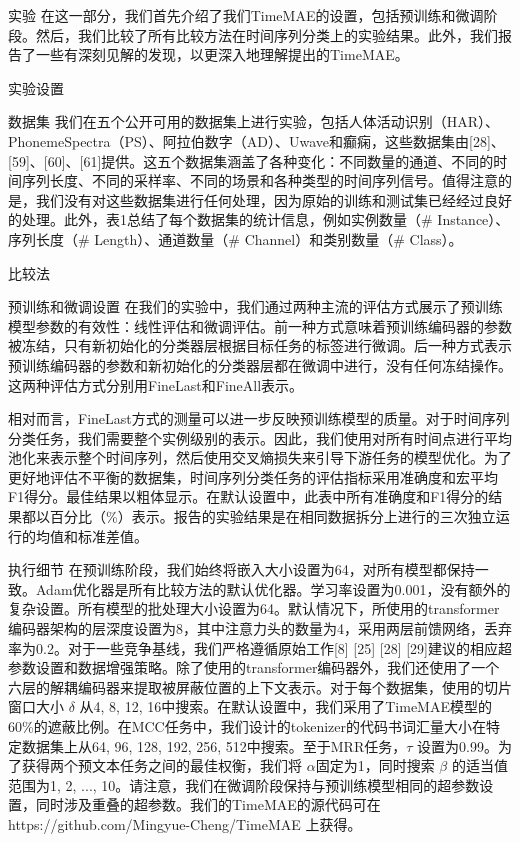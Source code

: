 \documentclass[a4paper,12pt]{article}
\begin{document}
\begin{section}{实验}
在这一部分，我们首先介绍了我们TimeMAE的设置，包括预训练和微调阶段。然后，我们比较了所有比较方法在时间序列分类上的实验结果。此外，我们报告了一些有深刻见解的发现，以更深入地理解提出的TimeMAE。
\begin{subsection}{实验设置}

\begin{subsubsection}{数据集}
我们在五个公开可用的数据集上进行实验，包括人体活动识别（HAR）、PhonemeSpectra（PS）、阿拉伯数字（AD）、Uwave和癫痫，这些数据集由[28]、[59]、[60]、[61]提供。这五个数据集涵盖了各种变化：不同数量的通道、不同的时间序列长度、不同的采样率、不同的场景和各种类型的时间序列信号。值得注意的是，我们没有对这些数据集进行任何处理，因为原始的训练和测试集已经经过良好的处理。此外，表1总结了每个数据集的统计信息，例如实例数量（\# Instance）、序列长度（\# Length）、通道数量（\# Channel）和类别数量（\# Class）。
\end{subsubsection}
\begin{subsubsection}{比较法}

\end{subsubsection}
\begin{subsubsection}{预训练和微调设置}
在我们的实验中，我们通过两种主流的评估方式展示了预训练模型参数的有效性：线性评估和微调评估。前一种方式意味着预训练编码器的参数被冻结，只有新初始化的分类器层根据目标任务的标签进行微调。后一种方式表示预训练编码器的参数和新初始化的分类器层都在微调中进行，没有任何冻结操作。这两种评估方式分别用FineLast和FineAll表示。

相对而言，FineLast方式的测量可以进一步反映预训练模型的质量。对于时间序列分类任务，我们需要整个实例级别的表示。因此，我们使用对所有时间点进行平均池化来表示整个时间序列，然后使用交叉熵损失来引导下游任务的模型优化。为了更好地评估不平衡的数据集，时间序列分类任务的评估指标采用准确度和宏平均F1得分。最佳结果以粗体显示。在默认设置中，此表中所有准确度和F1得分的结果都以百分比（\%）表示。报告的实验结果是在相同数据拆分上进行的三次独立运行的均值和标准差值。
\end{subsubsection}
\begin{subsubsection}{执行细节}
在预训练阶段，我们始终将嵌入大小设置为64，对所有模型都保持一致。Adam优化器是所有比较方法的默认优化器。学习率设置为0.001，没有额外的复杂设置。所有模型的批处理大小设置为64。默认情况下，所使用的transformer编码器架构的层深度设置为8，其中注意力头的数量为4，采用两层前馈网络，丢弃率为0.2。对于一些竞争基线，我们严格遵循原始工作[8] [25] [28] [29]建议的相应超参数设置和数据增强策略。除了使用的transformer编码器外，我们还使用了一个六层的解耦编码器来提取被屏蔽位置的上下文表示。对于每个数据集，使用的切片窗口大小 $\delta$ 从{4, 8, 12, 16}中搜索。在默认设置中，我们采用了TimeMAE模型的60\%的遮蔽比例。在MCC任务中，我们设计的tokenizer的代码书词汇量大小在特定数据集上从{64, 96, 128, 192, 256, 512}中搜索。至于MRR任务，$\tau$ 设置为0.99。为了获得两个预文本任务之间的最佳权衡，我们将 $\alpha$固定为1，同时搜索 $\beta$ 的适当值范围为{1, 2, ..., 10}。请注意，我们在微调阶段保持与预训练模型相同的超参数设置，同时涉及重叠的超参数。我们的TimeMAE的源代码可在https://github.com/Mingyue-Cheng/TimeMAE 上获得。
\end{subsubsection}
\end{subsection}


\end{section}
\end{document}
